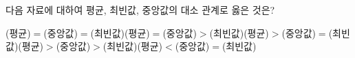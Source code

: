 다음 자료에 대하여 평균, 최빈값, 중앙값의 대소 관계로 옳은 것은? 
\begin{choicesv}{(평균)$=$(중앙값)$=$(최빈값)}{(평균)$=$(중앙값)$>$(최빈값)}{(평균)$>$(중앙값)$=$(최빈값)}{(평균)$>$(중앙값)$>$(최빈값)}{(평균)$<$(중앙값)$=$(최빈값)}\end{choicesv}
